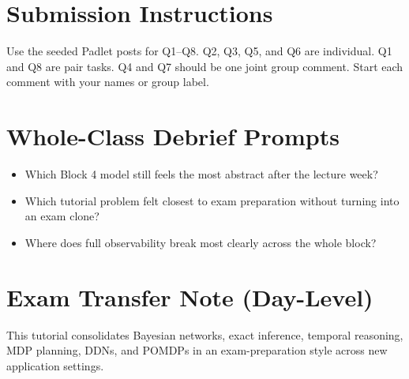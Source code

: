 \documentclass[11pt]{article}
\providecommand{\tightlist}{\setlength{\itemsep}{0pt}\setlength{\parskip}{0pt}}
\begin{document}
\section*{Submission Instructions}

Use the seeded Padlet posts for Q1--Q8. Q2, Q3, Q5, and Q6 are individual. Q1 and Q8 are pair tasks. Q4 and Q7 should be one joint group comment. Start each comment with your names or group label.

\section*{Whole-Class Debrief Prompts}

\begin{itemize}
\tightlist
\item
  Which Block 4 model still feels the most abstract after the lecture week?
\item
  Which tutorial problem felt closest to exam preparation without turning into an exam clone?
\item
  Where does full observability break most clearly across the whole block?
\end{itemize}

\section*{Exam Transfer Note (Day-Level)}

This tutorial consolidates Bayesian networks, exact inference, temporal reasoning, MDP planning, DDNs, and POMDPs in an exam-preparation style across new application settings.
\end{document}
